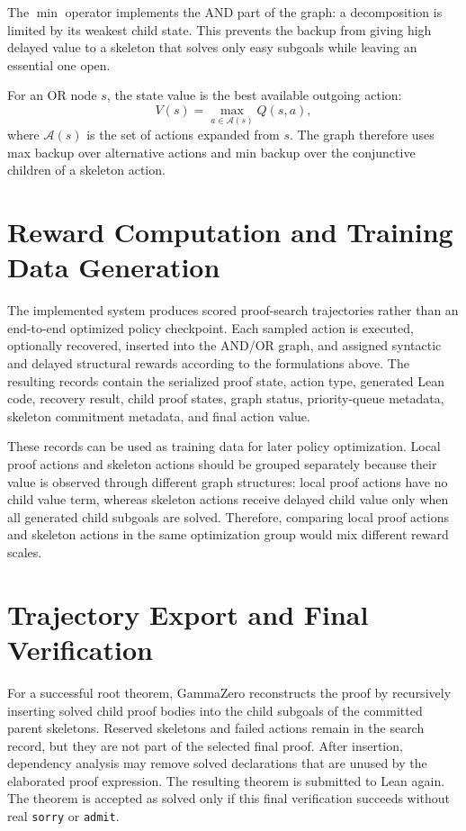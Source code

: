 \documentclass[en]{uet_awesome_thesis/uet-awesome-thesis}
\begin{document}
The \(\min\) operator implements the AND part of the graph: a decomposition is limited by its weakest
child state. This prevents the backup from giving high delayed value to a skeleton that solves only easy
subgoals while leaving an essential one open.

For an OR node \(s\), the state value is the best available outgoing action:
\[
V(s)=\max_{a \in \mathcal{A}(s)} Q(s,a),
\]
where \(\mathcal{A}(s)\) is the set of actions expanded from \(s\). The graph therefore uses max backup
over alternative actions and min backup over the conjunctive children of a skeleton action.

\section{Reward Computation and Training Data Generation}

The implemented system produces scored proof-search trajectories rather than an end-to-end optimized
policy checkpoint. Each sampled action is executed, optionally recovered, inserted into the AND/OR graph,
and assigned syntactic and delayed structural rewards according to the formulations above. The resulting records
contain the serialized proof state, action type, generated Lean code, recovery result, child proof states,
graph status, priority-queue metadata, skeleton commitment metadata, and final action value.

These records can be used as training data for later policy optimization. Local proof actions and
skeleton actions should be grouped separately because their value is observed through different graph
structures: local proof actions have no child value term, whereas skeleton actions receive delayed child
value only when all generated child subgoals are solved. Therefore, comparing local proof actions and
skeleton actions in the same optimization group would mix different reward scales.

\section{Trajectory Export and Final Verification}

For a successful root theorem, GammaZero reconstructs the proof by recursively inserting solved child
proof bodies into the child subgoals of the committed parent skeletons. Reserved skeletons and failed
actions remain in the search record, but they are not part of the selected final proof. After insertion,
dependency analysis may remove solved declarations that are unused by the elaborated proof expression.
The resulting theorem is submitted to Lean again. The theorem is accepted as solved only if this final
verification succeeds without real \texttt{sorry} or \texttt{admit}.
\end{document}
